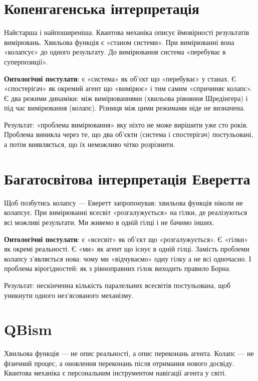 \documentclass[12pt, a4paper, openany]{book}
\begin{document}
\section{Копенгагенська інтерпретація}

Найстарша і найпоширеніша. Квантова механіка описує ймовірності результатів вимірювань. Хвильова функція є «станом системи». При вимірюванні вона «колапсує» до одного результату. До вимірювання система «перебуває в суперпозиції».

\textbf{Онтологічні постулати}: є «система» як об'єкт що «перебуває» у станах. Є «спостерігач» як окремий агент що «вимірює» і тим самим «спричиняє колапс». Є два режими динаміки: між вимірюваннями (хвильова рівняння Шредінгера) і під час вимірювання (колапс). Різниця між цими режимами ніде не визначена.

Результат: «проблема вимірювання» яку ніхто не може вирішити уже сто років. Проблема виникла через те, що два об'єкти (система і спостерігач) постульовані, а потім виявляється, що їх неможливо чітко розрізнити.

\section{Багатосвітова інтерпретація Еверетта}

Щоб позбутись колапсу — Еверетт запропонував: хвильова функція ніколи не колапсує. При вимірюванні всесвіт «розгалужується» на гілки, де реалізуються всі можливі результати. Ми живемо в одній гілці і не бачимо інших.

\textbf{Онтологічні постулати}: є «всесвіт» як об'єкт що «розгалужується». Є «гілки» як окремі реальності. Є «ми» як агент що існує в одній гілці. Замість проблеми колапсу з'являється нова: чому ми «відчуваємо» одну гілку а не всі одночасно. І проблема вірогідностей: як з рівноправних гілок виходить правило Борна.

Результат: нескінченна кількість паралельних всесвітів постульована, щоб уникнути одного нез'ясованого механізму.

\section{QBism}

Хвильова функція — не опис реальності, а опис переконань агента. Колапс — не фізичний процес, а оновлення переконань після отримання нового досвіду. Квантова механіка є персональним інструментом навігації агента у світі.
\end{document}
